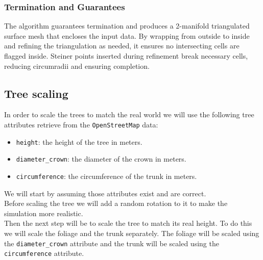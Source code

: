 \documentclass[12pt]{article}
\begin{document}
\subsubsection{Termination and Guarantees}
The algorithm guarantees termination and produces a 2-manifold triangulated
surface mesh that encloses the input data. By wrapping from outside to inside
and refining the triangulation as needed, it ensures no intersecting cells are
flagged inside. Steiner points inserted during refinement break necessary cells,
 reducing circumradii and ensuring completion.

\subsection{Tree scaling}
In order to scale the trees to match the real world we will use the
following tree attributes retrieve from the \texttt{OpenStreetMap} data:
\begin{itemize}
    \item \texttt{height}: the height of the tree in meters.
    \item \texttt{diameter\_crown}: the diameter of the crown in meters.
    \item \texttt{circumference}: the circumference of the trunk in meters.
\end{itemize}

We will start by assuming those attributes exist and are correct.\\
Before scaling the tree we will add a random rotation to it to make the
simulation more realistic.\\
Then the next step will be to scale the tree to match its real height. To do this we
will scale the foliage and the trunk separately. The foliage will be scaled
using the \texttt{diameter\_crown} attribute and the trunk will be scaled using
the \texttt{circumference} attribute.\\
\end{document}
